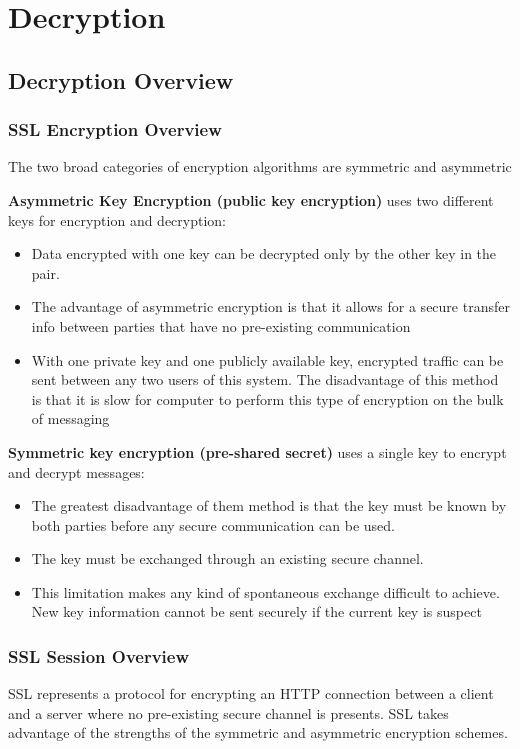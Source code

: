 \section{Decryption}
\subsection{Decryption Overview}
\subsubsection{SSL Encryption Overview}
The two broad categories of encryption algorithms are symmetric and asymmetric

\textbf{Asymmetric Key Encryption (public key encryption)} uses two different keys for encryption and decryption:
\begin{itemize}
    \item Data encrypted with one key can be decrypted only by the other key in the pair.
    \item The advantage of asymmetric encryption is that it allows for a secure transfer info between parties that have no pre-existing communication
    \item With one private key and one publicly available key, encrypted traffic can be sent between any two users of this system.
    The disadvantage of this method is that it is slow for computer to perform this type of encryption on the bulk of messaging
\end{itemize}

\textbf{Symmetric key encryption (pre-shared secret)} uses a single key to encrypt and decrypt messages:
\begin{itemize}
    \item The greatest disadvantage of them method is that the key must be known by both parties before any secure communication can be used.
    \item The key must be exchanged through an existing secure channel.
    \item This limitation makes any kind of spontaneous exchange difficult to achieve.
    New key information cannot be sent securely if the current key is suspect
\end{itemize}

\subsubsection{SSL Session Overview}
SSL represents a protocol for encrypting an HTTP connection between a client and a server where no pre-existing secure channel is presents.
SSL takes advantage of the strengths of the symmetric and asymmetric encryption schemes.


